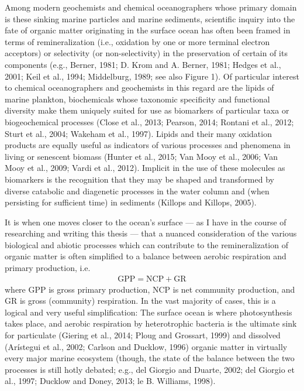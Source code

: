 Among modern geochemists and chemical oceanographers whose primary domain is these sinking marine particles and marine sediments, scientific inquiry into the fate of organic matter originating in the surface ocean has often been framed in terms of remineralization (i.e., oxidation by one or more terminal electron acceptors) or selectivity (or non-selectivity) in the preservation of certain of its components (e.g., Berner, 1981; D. Krom and A. Berner, 1981; Hedges et al., 2001; Keil et al., 1994; Middelburg, 1989; see also Figure 1). Of particular interest to chemical oceanographers and geochemists in this regard are the lipids of marine plankton, biochemicals whose taxonomic specificity and functional diversity make them uniquely suited for use as biomarkers of particular taxa or biogeochemical processes (Close et al., 2013; Pearson, 2014; Rontani et al., 2012; Sturt et al., 2004; Wakeham et al., 1997). Lipids and their many oxidation products are equally useful as indicators of various processes and phenomena in living or senescent biomass (Hunter et al., 2015; Van Mooy et al., 2006; Van Mooy et al., 2009; Vardi et al., 2012). Implicit in the use of these molecules as biomarkers is the recognition that they may be shaped and transformed by diverse catabolic and diagenetic processes in the water column and (when persisting for sufficient time) in sediments (Killops and Killops, 2005).

It is when one moves closer to the ocean's surface --- as I have in the course of researching and writing this thesis --- that a nuanced consideration of the various biological and abiotic processes which can contribute to the remineralization of organic matter is often simplified to a balance between aerobic respiration and primary production, i.e.
\begin{equation}
\begin{aligned}
  \text{GPP}=\text{NCP}+\text{GR}
\end{aligned}
\end{equation}
where GPP is gross primary production, NCP is net community production, and GR is gross (community) respiration. In the vast majority of cases, this is a logical and very useful simplification: The surface ocean is where photosynthesis takes place, and aerobic respiration by heterotrophic bacteria is the ultimate sink for particulate (Giering et al., 2014; Ploug and Grossart, 1999) and dissolved (Ar\'{i}stegui et al., 2002; Carlson and Ducklow, 1996) organic matter in virtually every major marine ecosystem (though, the state of the balance between the two processes is still hotly debated; e.g., del Giorgio and Duarte, 2002; del Giorgio et al., 1997; Ducklow and Doney, 2013; le B. Williams, 1998).

